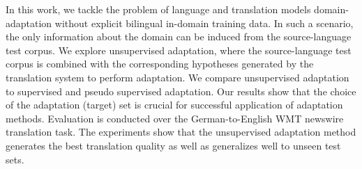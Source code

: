 In this work, we tackle the problem of language and translation models domain-adaptation without explicit bilingual in-domain training data. In such a scenario, the only information about the domain can be induced from the source-language test corpus. We explore unsupervised adaptation, where the source-language test corpus is combined with the corresponding hypotheses generated by the translation system to perform adaptation. We compare unsupervised adaptation to supervised and pseudo supervised adaptation. Our results show that the choice of the adaptation (target) set is crucial for successful application of adaptation methods. Evaluation is conducted over the German-to-English WMT newswire translation task. The experiments show that the unsupervised adaptation method generates the best translation quality as well as generalizes well to unseen test sets.
